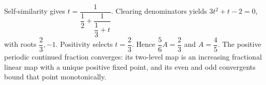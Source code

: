 Self-similarity gives $ t=\dfrac{1}{\dfrac{1}{2}+\dfrac{1}{\dfrac{1}{3}+t}}$. Clearing denominators yields $ 3t^2+t-2=0 $, with roots $\dfrac{2}{3},-1 $. Positivity selects $ t=\dfrac{2}{3}$. Hence $\dfrac{5}{6}A=\dfrac{2}{3}$ and $\boxed{A=\dfrac{4}{5}}$. The positive periodic continued fraction converges: its two-level map is an increasing fractional linear map with a unique positive fixed point, and its even and odd convergents bound that point monotonically.
